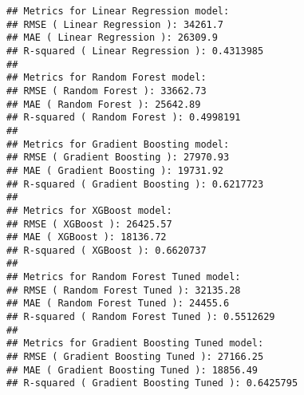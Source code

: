 \documentclass[
]{article}
\newenvironment{Shaded}{\begin{snugshade}}{\end{snugshade}}
\newcommand{\AttributeTok}[1]{\textcolor[rgb]{0.13,0.29,0.53}{#1}}
\newcommand{\CommentTok}[1]{\textcolor[rgb]{0.56,0.35,0.01}{\textit{#1}}}
\newcommand{\ControlFlowTok}[1]{\textcolor[rgb]{0.13,0.29,0.53}{\textbf{#1}}}
\newcommand{\FunctionTok}[1]{\textcolor[rgb]{0.13,0.29,0.53}{\textbf{#1}}}
\newcommand{\NormalTok}[1]{#1}
\newcommand{\OtherTok}[1]{\textcolor[rgb]{0.56,0.35,0.01}{#1}}
\newcommand{\SpecialCharTok}[1]{\textcolor[rgb]{0.81,0.36,0.00}{\textbf{#1}}}
\newcommand{\StringTok}[1]{\textcolor[rgb]{0.31,0.60,0.02}{#1}}
\begin{document}
\begin{Shaded}
\end{Shaded}

\begin{verbatim}
## Metrics for Linear Regression model:
## RMSE ( Linear Regression ): 34261.7 
## MAE ( Linear Regression ): 26309.9 
## R-squared ( Linear Regression ): 0.4313985 
## 
## Metrics for Random Forest model:
## RMSE ( Random Forest ): 33662.73 
## MAE ( Random Forest ): 25642.89 
## R-squared ( Random Forest ): 0.4998191 
## 
## Metrics for Gradient Boosting model:
## RMSE ( Gradient Boosting ): 27970.93 
## MAE ( Gradient Boosting ): 19731.92 
## R-squared ( Gradient Boosting ): 0.6217723 
## 
## Metrics for XGBoost model:
## RMSE ( XGBoost ): 26425.57 
## MAE ( XGBoost ): 18136.72 
## R-squared ( XGBoost ): 0.6620737 
## 
## Metrics for Random Forest Tuned model:
## RMSE ( Random Forest Tuned ): 32135.28 
## MAE ( Random Forest Tuned ): 24455.6 
## R-squared ( Random Forest Tuned ): 0.5512629 
## 
## Metrics for Gradient Boosting Tuned model:
## RMSE ( Gradient Boosting Tuned ): 27166.25 
## MAE ( Gradient Boosting Tuned ): 18856.49 
## R-squared ( Gradient Boosting Tuned ): 0.6425795
\end{verbatim}
\end{document}

